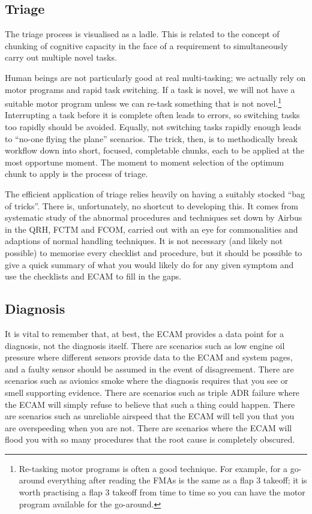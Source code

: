 \documentclass[a5paper,11pt,titlepage]{article}
\begin{document}
\subsection{Triage}
The triage process is visualised as a ladle. This is related to the
concept of chunking of cognitive capacity in the face of a requirement
to simultaneously carry out multiple novel tasks.

Human beings are not particularly good at real multi-tasking; we
actually rely on motor programs and rapid task switching. If a task is
novel, we will not have a suitable motor program unless we can re-task
something that is not novel.\footnote{Re-tasking motor programs is often a good technique. For
  example, for a go-around everything after reading the FMAs is the same
  as a flap 3 takeoff; it is worth practising a flap 3 takeoff from time
  to time so you can have the motor program available for the
  go-around.} Interrupting a task before it is complete often leads to
errors, so switching tasks too rapidly should be avoided. Equally, not
switching tasks rapidly enough leads to ``no-one flying the plane''
scenarios. The trick, then, is to methodically break workflow down into
short, focused, completable chunks, each to be applied at the most
opportune moment. The moment to moment selection of the optimum chunk to
apply is the process of triage.

The efficient application of triage relies heavily on having a suitably
stocked ``bag of tricks''. There is, unfortunately, no shortcut to
developing this. It comes from systematic study of the abnormal
procedures and techniques set down by Airbus in the QRH, FCTM and FCOM,
carried out with an eye for commonalities and adaptions of normal
handling techniques. It is not necessary (and likely not possible) to
memorise every checklist and procedure, but it should be possible to
give a quick summary of what you would likely do for any given symptom
and use the checklists and ECAM to fill in the gaps.

\subsection{Diagnosis}

It is vital to remember that, at best, the ECAM provides a data point
for a diagnosis, not the diagnosis itself. There are scenarios such as
low engine oil pressure where different sensors provide data to the ECAM
and system pages, and a faulty sensor should be assumed in the event of
disagreement. There are scenarios such as avionics smoke where the
diagnosis requires that you see or smell supporting evidence. There are
scenarios such as triple ADR failure where the ECAM will simply refuse
to believe that such a thing could happen. There are scenarios such as
unreliable airspeed that the ECAM will tell you that you are
overspeeding when you are not. There are scenarios where the ECAM will
flood you with so many procedures that the root cause is completely
obscured.
\end{document}
